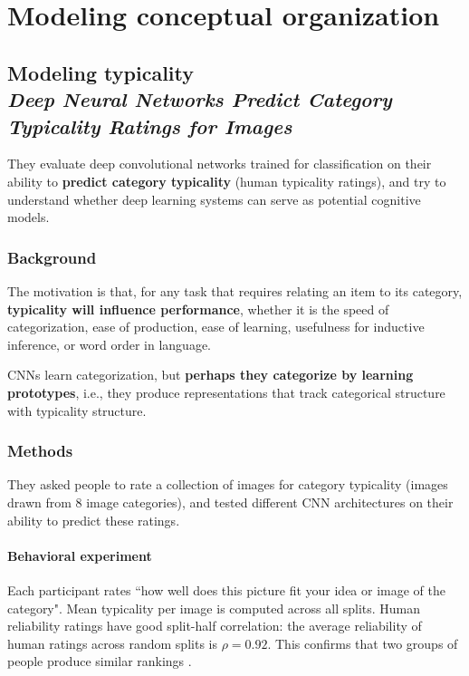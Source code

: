 \chapter{Modeling conceptual organization}
\label{chap:modeling_conceptual_organization}

\section[Modeling typicality]{Modeling typicality\\ \large{\textit{Deep Neural Networks Predict Category Typicality Ratings for Images}\\ }}

They evaluate deep convolutional networks trained for classification on their ability to \textbf{predict category typicality} (human typicality ratings), and try to understand whether deep learning systems can serve as potential cognitive models.

\subsection{Background}
The motivation is that, for any task that requires relating an item to its category, \textbf{typicality will influence performance}, whether it is the speed of categorization, ease of production, ease of learning, usefulness for inductive inference, or word order in language.

CNNs learn categorization, but \textbf{perhaps they categorize by learning prototypes}, i.e., they produce representations that track categorical structure with typicality structure.

\subsection{Methods}
They asked people to rate a collection of images for category typicality (images drawn from 8 image categories), and tested different CNN architectures on their ability to predict these ratings.

\subsubsection{Behavioral experiment}
Each participant rates ``how well does this picture fit your idea or image of the category". Mean typicality per image is computed across all splits. Human reliability ratings have good split-half correlation: the average reliability of human ratings across random splits is $\rho=0.92$. This confirms that two groups of people produce similar rankings \notet.

